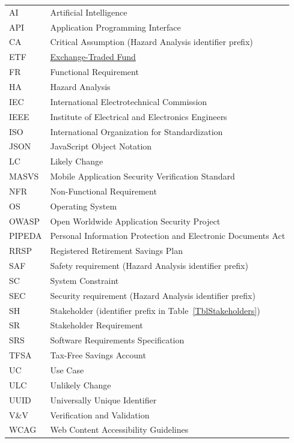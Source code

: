 \documentclass[12pt]{article}
\begin{document}
\begin{longtable}{>{\raggedright\arraybackslash}p{} p{}}
  \midrule
  \multicolumn{2}{l}{\textit{Acronyms}}                                                                                                                                                                                        \\
  \midrule
  AI & Artificial Intelligence \\
  API & Application Programming Interface \\
  CA & Critical Assumption (Hazard Analysis identifier prefix) \\
  ETF & \hyperref[def:etf]{Exchange-Traded Fund} \\
  FR & Functional Requirement \\
  HA & Hazard Analysis \\
  IEC & International Electrotechnical Commission \\
  IEEE & Institute of Electrical and Electronics Engineers \\
  ISO & International Organization for Standardization \\
  JSON & JavaScript Object Notation \\
  LC & Likely Change \\
  MASVS & Mobile Application Security Verification Standard \\
  NFR & Non-Functional Requirement \\
  OS & Operating System \\
  OWASP & Open Worldwide Application Security Project \\
  PIPEDA & Personal Information Protection and Electronic Documents Act \\
  RRSP & Registered Retirement Savings Plan \\
  SAF & Safety requirement (Hazard Analysis identifier prefix) \\
  SC & System Constraint \\
  SEC & Security requirement (Hazard Analysis identifier prefix) \\
  SH & Stakeholder (identifier prefix in Table~\ref{TblStakeholders}) \\
  SR & Stakeholder Requirement \\
  SRS & Software Requirements Specification \\
  TFSA & Tax-Free Savings Account \\
  UC & Use Case \\
  ULC & Unlikely Change \\
  UUID & Universally Unique Identifier \\
  V\&V & Verification and Validation \\
  WCAG & Web Content Accessibility Guidelines \\
\end{longtable}
\end{document}
